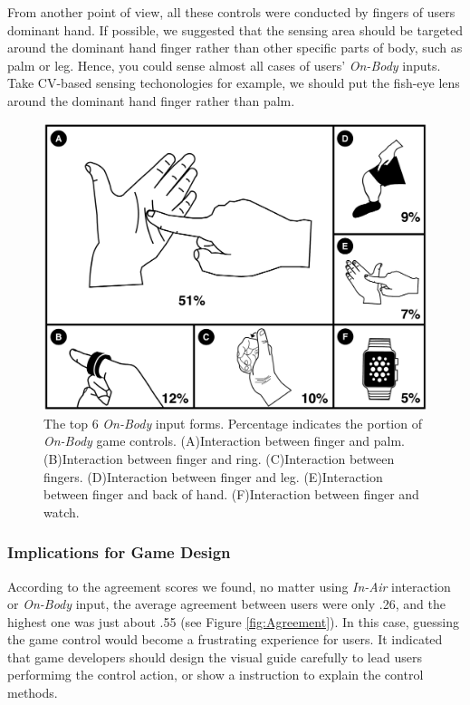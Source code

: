 \documentclass{sigchi}
\begin{document}
    From another point of view, all these controls were conducted by fingers of users dominant hand. If possible, we suggested that the sensing area should be targeted around the dominant hand finger rather than other specific parts of body, such as palm or leg. Hence, you could sense almost all cases of users' \emph{On-Body} inputs. Take CV-based sensing techonologies for example, we should put the fish-eye lens around the dominant hand finger rather than palm.

 \begin{figure}[!h]
  \centering
  \includegraphics[width=1\columnwidth]{OnBodyForms.pdf}
  \caption{The top 6 \emph{On-Body} input forms. Percentage indicates the portion of \emph{On-Body} game controls. (A)Interaction between finger and palm. (B)Interaction between finger and ring. (C)Interaction between fingers. (D)Interaction between finger and leg. (E)Interaction between finger and back of hand. (F)Interaction between finger and watch.}
  \label{fig:figureOnBodyPorpotion}
  \end{figure}   



  \subsubsection{Implications for Game Design}
  According to the agreement scores we found, no matter using \emph{In-Air} interaction or \emph{On-Body} input, the average agreement between users were only .26, and the highest one was just about .55 (see Figure \ref{fig:Agreement}). In this case, guessing the game control would become a frustrating experience for users. It indicated that game developers should design the visual guide carefully to lead users performimg the control action, or show a instruction to explain the control methods.
\end{document}

